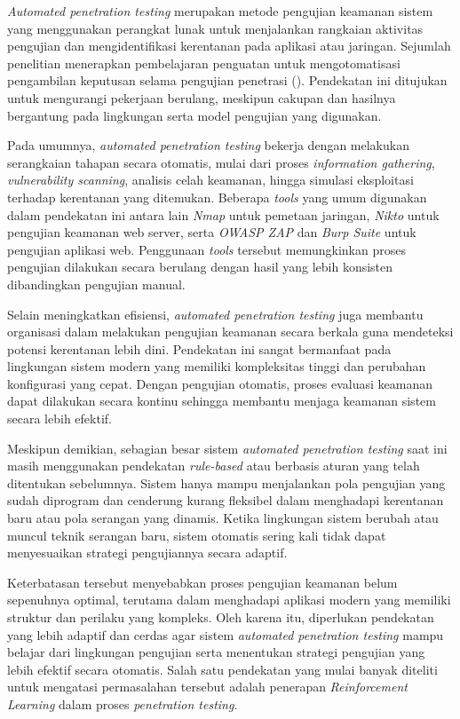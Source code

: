 \textit{Automated penetration testing} merupakan metode pengujian keamanan sistem yang menggunakan perangkat lunak untuk menjalankan rangkaian aktivitas pengujian dan mengidentifikasi kerentanan pada aplikasi atau jaringan. Sejumlah penelitian menerapkan pembelajaran penguatan untuk mengotomatisasi pengambilan keputusan selama pengujian penetrasi (\cite{ghanem2023hrl,zennaro2023}). Pendekatan ini ditujukan untuk mengurangi pekerjaan berulang, meskipun cakupan dan hasilnya bergantung pada lingkungan serta model pengujian yang digunakan.

Pada umumnya, \textit{automated penetration testing} bekerja dengan melakukan serangkaian tahapan secara otomatis, mulai dari proses \textit{information gathering}, \textit{vulnerability scanning}, analisis celah keamanan, hingga simulasi eksploitasi terhadap kerentanan yang ditemukan. Beberapa \textit{tools} yang umum digunakan dalam pendekatan ini antara lain \textit{Nmap} untuk pemetaan jaringan, \textit{Nikto} untuk pengujian keamanan web server, serta \textit{OWASP ZAP} dan \textit{Burp Suite} untuk pengujian aplikasi web. Penggunaan \textit{tools} tersebut memungkinkan proses pengujian dilakukan secara berulang dengan hasil yang lebih konsisten dibandingkan pengujian manual.

Selain meningkatkan efisiensi, \textit{automated penetration testing} juga membantu organisasi dalam melakukan pengujian keamanan secara berkala guna mendeteksi potensi kerentanan lebih dini. Pendekatan ini sangat bermanfaat pada lingkungan sistem modern yang memiliki kompleksitas tinggi dan perubahan konfigurasi yang cepat. Dengan pengujian otomatis, proses evaluasi keamanan dapat dilakukan secara kontinu sehingga membantu menjaga keamanan sistem secara lebih efektif.

Meskipun demikian, sebagian besar sistem \textit{automated penetration testing} saat ini masih menggunakan pendekatan \textit{rule-based} atau berbasis aturan yang telah ditentukan sebelumnya. Sistem hanya mampu menjalankan pola pengujian yang sudah diprogram dan cenderung kurang fleksibel dalam menghadapi kerentanan baru atau pola serangan yang dinamis. Ketika lingkungan sistem berubah atau muncul teknik serangan baru, sistem otomatis sering kali tidak dapat menyesuaikan strategi pengujiannya secara adaptif.

Keterbatasan tersebut menyebabkan proses pengujian keamanan belum sepenuhnya optimal, terutama dalam menghadapi aplikasi modern yang memiliki struktur dan perilaku yang kompleks. Oleh karena itu, diperlukan pendekatan yang lebih adaptif dan cerdas agar sistem \textit{automated penetration testing} mampu belajar dari lingkungan pengujian serta menentukan strategi pengujian yang lebih efektif secara otomatis. Salah satu pendekatan yang mulai banyak diteliti untuk mengatasi permasalahan tersebut adalah penerapan \textit{Reinforcement Learning} dalam proses \textit{penetration testing}.

